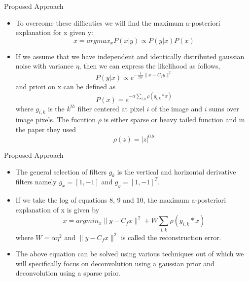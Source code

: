 \documentclass{beamer}
\begin{document}
\begin{frame}{Proposed Approach}
  \begin{itemize}
  \item {
   To overcome these difficuties we will find the maximum a-posteriori explanation for x given y:
\begin{equation}
x = argmax_xP(x|y) \propto P(y|x)P(x)
\end{equation} 
    \pause %
  }
  \item {   
    If we assume that we have independent and identically distributed gaussian noise with variance $\eta$, then we can express the likelihood as follows,
\begin{equation}
P(y|x) \propto e^{-\frac{1}{2\eta^2} \parallel x-C_fy \parallel^2}
\end{equation}
and priori on x can be defined as
\begin{equation}
P(x) = e^{-\alpha\sum_{i,k}\rho(g_{i,k}*x)}
\end{equation}
where $g_{i,k}$ is the $k^{th}$ filter centered at pixel $i$ of the image and $i$ sums over image pixels. The fucntion $\rho$ is either sparse or heavy tailed function and in the paper they used 
\begin{equation}
\rho(z) = |z|^{0.8}
\end{equation}
  }
  \end{itemize}
\end{frame}

\begin{frame}{Proposed Approach}
  \begin{itemize}
  \item {
   The general selection of filters $g_k$ is the vertical and horizontal derivative filters namely $g_x = [1, -1]$ and $g_y = [1, -1]^T$. 
    \pause %
  }
  \item {   
    If we take the log of equations 8, 9 and 10, the maximum a-posteriori  explanation of x is given by
\begin{equation}
x = argmin_x \parallel y - C_fx \parallel^2 + W \sum_{i,k} \rho(g_{i,k}*x)
\end{equation}
where $W = \alpha\eta^2$ and $\parallel y - C_fx \parallel^2$ is called the reconstruction error.\pause
  }
\item {
	The above equation can be solved using various techniques out of which we will specifically focus on deconvolution using a gaussian prior and deconvolution using a sparse prior.
}  
  
  \end{itemize}
\end{frame}
\end{document}
